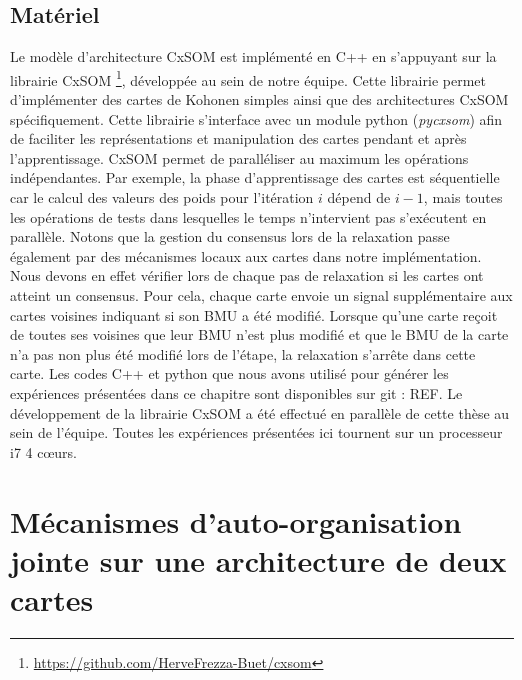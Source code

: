 \documentclass[../main]{subfiles}
\begin{document}




\subsection{Matériel}

Le modèle d'architecture CxSOM est implémenté en C++ en s'appuyant sur la librairie CxSOM \footnote{\url{https://github.com/HerveFrezza-Buet/cxsom}}, développée au sein de notre équipe.
Cette librairie permet d'implémenter des cartes de Kohonen simples ainsi que des architectures CxSOM spécifiquement.
Cette librairie s'interface avec un module python (\emph{pycxsom}) afin de faciliter les représentations et manipulation des cartes pendant et après l'apprentissage.
CxSOM permet de paralléliser au maximum les opérations indépendantes. Par exemple, la phase d'apprentissage des cartes est séquentielle car le calcul des valeurs des poids pour l'itération $i$ dépend de $i-1$, mais toutes les opérations de tests dans lesquelles le temps n'intervient pas s'exécutent en parallèle.
Notons que la gestion du consensus lors de la relaxation passe également par des mécanismes locaux aux cartes dans notre implémentation. 
Nous devons en effet vérifier lors de chaque pas de relaxation si les cartes ont atteint un consensus. Pour cela, chaque carte envoie un signal supplémentaire aux cartes voisines indiquant si son BMU a été modifié. Lorsque qu'une carte reçoit de toutes ses voisines que leur BMU n'est plus modifié et que le BMU de la carte n'a pas non plus été modifié lors de l'étape, la relaxation s'arrête dans cette carte.
Les codes C++ et python que nous avons utilisé pour générer les expériences présentées dans ce chapitre sont disponibles sur git : REF.
Le développement de la librairie CxSOM a été effectué en parallèle de cette thèse au sein de l'équipe. 
Toutes les expériences présentées ici tournent sur un processeur i7 4 c\oe{}urs.



\section{Mécanismes d'auto-organisation jointe sur une architecture de deux cartes}
\end{document}
